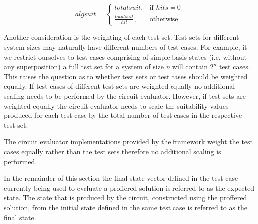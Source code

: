\begin{equation}
 algsuit = 
\left\{
  \begin{array}{cc} totalsuit, & \mbox{if } hits={0}\\ 
  \frac{totalsuit}{hit}, & \mbox{otherwise}\end{array}
\right.
\label{eqn:cirevalhitsscaling}
\end{equation}

Another consideration is the weighting of each test set.
Test sets for different system sizes may naturally have different numbers of test cases.
For example, it we restrict ourselves to test cases comprising of simple basis states (i.e. without any superposition) a full test set for a system of size $n$ will contain $2^n$ test cases.
This raises the question as to whether test sets or test cases should be weighted equally.
If test cases of different test sets are weighted equally no additional scaling needs to be performed by the circuit evaluator.
However, if test sets are weighted equally the circuit evaluator needs to scale the suitability values produced for each test case by the total number of test cases in the respective test set.

The circuit evaluator implementations provided by the framework weight the test cases equally rather than the test sets therefore no additional scaling is performed.

In the remainder of this section the final state vector defined in the test case currently being used to evaluate a proffered solution is referred to as the expected state.
The state that is produced by the circuit, constructed using the proffered solution, from the initial state defined in the same test case is referred to as the final state.

